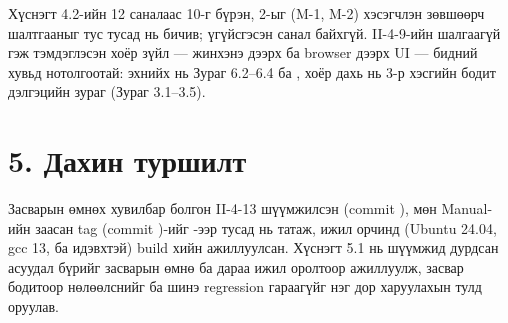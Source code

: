 Хүснэгт 4.2-ийн 12 саналаас 10-г бүрэн, 2-ыг (M-1, M-2) хэсэгчлэн зөвшөөрч шалтгааныг тус тусад нь бичив; үгүйсгэсэн санал байхгүй. II-4-9-ийн шалгаагүй гэж тэмдэглэсэн хоёр зүйл --- жинхэнэ  дээрх  ба browser дээрх UI --- бидний хувьд нотолгоотай: эхнийх нь Зураг 6.2--6.4 ба , хоёр дахь нь 3-р хэсгийн бодит дэлгэцийн зураг (Зураг 3.1--3.5).

\section*{5. Дахин туршилт}

Засварын өмнөх хувилбар болгон II-4-13 шүүмжилсэн  (commit ), мөн Manual-ийн заасан  tag (commit )-ийг -ээр тусад нь татаж, ижил орчинд (Ubuntu 24.04, gcc 13,  ба  идэвхтэй) build хийн ажиллуулсан. Хүснэгт 5.1 нь шүүмжид дурдсан асуудал бүрийг засварын өмнө ба дараа ижил оролтоор ажиллуулж, засвар бодитоор нөлөөлснийг ба шинэ regression гараагүйг нэг дор харуулахын тулд оруулав.

